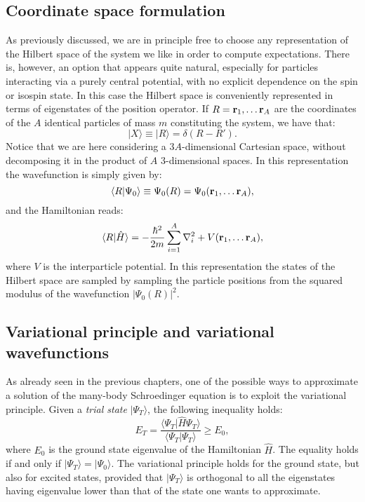 \subsection{Coordinate space formulation}
As previously discussed, we are in principle free to choose any representation of the Hilbert
space of the system we like in order to compute expectations. There is, however,  an option 
that appears quite natural, especially for particles interacting via a purely central
potential, with no explicit dependence on the spin or isospin state.
In this case the Hilbert space is conveniently represented in terms of eigenstates of the
position operator. If $R={{\bf r}_1,\dots{\bf r}_A}$ are the coordinates of the $A$ 
identical particles of mass $m$ constituting the system, we have that:
\begin{equation}
\vert X\rangle \equiv \vert R \rangle = \delta(R-R').
\end{equation}
Notice that we are here considering a $3A$-dimensional Cartesian space, without decomposing it
in the product of $A$ $3$-dimensional spaces. In this representation the wavefunction 
is simply given by:
\begin{equation}
\langle R\vert\Psi_0\rangle \equiv \Psi_0(R)=\Psi_0({\bf r}_1,\dots{\bf r}_A),
\end{equation}
and the Hamiltonian reads:
\begin{equation}
\langle R\vert\hat{H}\rangle=-\frac{\hbar^2}{2m}\sum_{i=1}^A \nabla^2_i +V({\bf r}_1,\dots{\bf r}_A),
\end{equation}
where $V$ is the interparticle potential. 
In this representation the states of the Hilbert space are sampled by sampling the particle
positions from the squared modulus of the wavefunction $\vert\Psi_0(R)\vert^2$. 

\subsection{Variational principle and variational wavefunctions}
As already seen in the previous chapters, one of the possible ways to approximate
a solution of the many-body Schroedinger equation is to exploit the variational principle.
Given a {\it trial state} $|\Psi_T\rangle$, the following inequality holds:
\begin{equation}
E_T=\frac{\langle \Psi_T\vert \hat{H}\Psi_T\rangle}{\langle\Psi_T\vert\Psi_T\rangle}\geq E_0,
\end{equation}
where $E_0$ is the ground state eigenvalue of the Hamiltonian $\hat{H}$. The equality holds
if and only if $\vert \Psi_T\rangle = \vert \Psi_0\rangle$. The variational principle holds for the ground state, but also for excited states, provided that $\vert \Psi_T\rangle$ is 
orthogonal to all the eigenstates having eigenvalue lower than that of the state one wants
to approximate.

